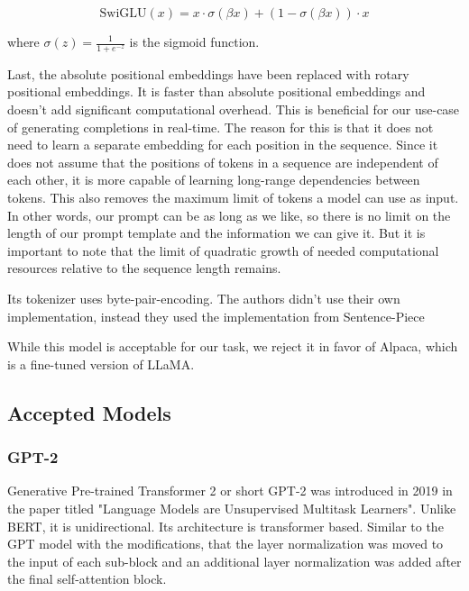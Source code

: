 \begin{equation}
\text{SwiGLU}(x) = x \cdot \sigma(\beta x) + (1 - \sigma(\beta x)) \cdot x
\end{equation}

where \(\sigma(z) = \frac{1}{1 + e^{-z}}\) is the sigmoid function.

Last, the absolute positional embeddings have been replaced with rotary positional embeddings. It is faster than absolute positional embeddings and doesn't add significant computational overhead. This is beneficial for our use-case of generating completions in real-time. The reason for this is that it does not need to learn  a separate embedding for each position in the sequence. Since it does not assume that the positions of tokens in a sequence are independent of each other, it is more capable of learning long-range dependencies between tokens. This also removes the maximum limit of tokens a model can use as input. In other words, our prompt can be as long as we like, so there is no limit on the length of our prompt template and the information we can give it. But it is important to note that the limit of quadratic growth of needed computational resources 
relative to the sequence length remains.



Its tokenizer uses byte-pair-encoding\cite{touvron2023llama}. The authors didn't use their own implementation, instead they used the implementation from Sentence-Piece \cite{kudo2018sentencepiece}



While this model is acceptable for our task, we reject it in favor of Alpaca, which is a fine-tuned version of LLaMA.

\subsection{Accepted Models}

\subsubsection{GPT-2}

Generative Pre-trained Transformer 2 or short GPT-2 was introduced in 2019 in the paper titled "Language Models are Unsupervised Multitask Learners"\cite{Radford2019LanguageMA}. Unlike BERT, it is unidirectional. Its architecture is transformer based. Similar to the GPT model with the modifications, that the layer normalization was moved to the input of each sub-block and an additional layer normalization was added after the final self-attention block\cite{Radford2019LanguageMA}.


